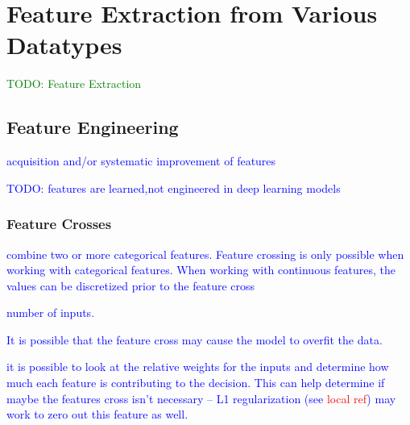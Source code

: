 \section{Feature Extraction from Various Datatypes}

\textcolor{green}{TODO: Feature Extraction}

\subsection{Feature Engineering}

\textcolor{blue}{acquisition and/or systematic improvement of features}

\textcolor{blue}{TODO: features are learned,not engineered in deep learning models}

\subsubsection{Feature Crosses}


\textcolor{blue}{combine two or more categorical features. Feature crossing is only possible when working with categorical features. When working with continuous features, the values can be discretized prior to the feature cross}



\textcolor{blue}{number of inputs.}

\textcolor{blue}{It is possible that the feature cross may cause the model to overfit the data.}


\textcolor{blue}{it is possible to look at the relative weights for the inputs and determine how much each feature is contributing to the decision. This can help determine if maybe the features cross isn't necessary -- L1 regularization (see \textcolor{red}{local ref}) may work to zero out this feature as well.}

